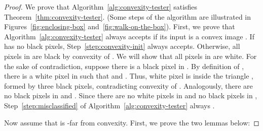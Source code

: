 \documentclass[11pt,english]{article}
\numberwithin{figure}{section}
\begin{document}
\begin{proof}
We prove that Algorithm~\ref{alg:convexity-tester} satisfies
Theorem~\ref{thm:convexity-tester}. (Some steps of the algorithm are illustrated in Figures~\ref{fig:enclosing-box} and~\ref{fig:walk-on-the-box}).
First, we prove that Algorithm~\ref{alg:convexity-tester} always accepts if its input is a convex image . If  has no black pixels, Step~\ref{step:convexity-init} always accepts. Otherwise, all pixels in  are black by convexity of .
We will show that all pixels in  are
white.
For the sake of contradiction, suppose there is a black pixel  in . By definition of , there is a white pixel  in  such that  and . Thus, white pixel  is inside the
triangle , formed by three black pixels, contradicting convexity of . Analogously, there are no black pixels in  and . Since there are no white pixels in  and no black pixels in ,
Step~\ref{step:misclassified} of Algorithm~\ref{alg:convexity-tester} always .

Now assume that  is -far from convexity. First, we prove the two
lemmas below:


\end{proof}
\end{document}
